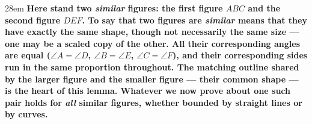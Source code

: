 \documentclass[border=4pt]{standalone}
\begin{document}
\begin{varwidth}{28em}
\large\bfseries
Here stand two \emph{similar} figures: \textcolor{simblue}{the first figure $ABC$} and \textcolor{simgreen}{the second figure $DEF$}. To say that two figures are \emph{similar} means that they have exactly the same shape, though not necessarily the same size --- one may be a scaled copy of the other. All their corresponding angles are equal ($\angle A = \angle D$, $\angle B = \angle E$, $\angle C = \angle F$), and their corresponding sides run in the same proportion throughout. The matching outline shared by \textcolor{simblue}{the larger figure} and \textcolor{simgreen}{the smaller figure} --- their common shape --- is the heart of this lemma. Whatever we now prove about one such pair holds for \emph{all} similar figures, whether bounded by straight lines or by curves.
\end{varwidth}
\end{document}
